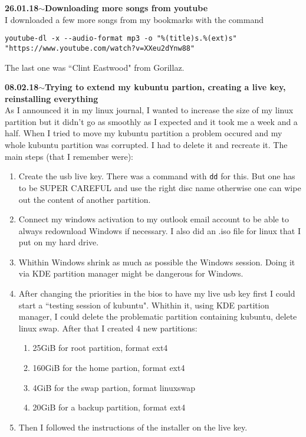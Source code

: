 \documentclass[11pt,a4paper]{article}
\newenvironment{loggentry}[2]%
{\noindent\textbf{#1}\hspace{1cm}$\mathbf{\sim}$\text{ }\textbf{#2}\\}{\vspace{0.5cm}}
\begin{document}
\begin{loggentry}{26.01.18}{Downloading more songs from youtube}
I downloaded a few more songs from my bookmarks with the command
\begin{verbatim}
youtube-dl -x --audio-format mp3 -o "%(title)s.%(ext)s" "https://www.youtube.com/watch?v=XXeu2dYnw88"
\end{verbatim}
The last one was ``Clint Eastwood" from Gorillaz.
\end{loggentry}

\begin{loggentry}{08.02.18}{Trying to extend my kubuntu partion, creating a live key, reinstalling everything}
As I announced it in my linux journal, I wanted to increase the size of my linux partition but it didn't go as smoothly as I expected and it took me a week and a half. When I tried to move my kubuntu partition a problem occured and my whole kubuntu partition was corrupted. I had to delete it and recreate it. The main steps (that I remember were):\\
\begin{enumerate}
\item Create the usb live key. There was a command with \texttt{dd} for this. But one has to be SUPER CAREFUL and use the right disc name otherwise one can wipe out the content of another partition.
\item Connect my windows activation to my outlook email account to be able to always redownload Windows if necessary. I also did an .iso file for linux that I put on my hard drive.
\item Whithin Windows shrink as much as possible the Windows session. Doing it via KDE partition manager might be dangerous for Windows.
\item After changing the priorities in the bios to have my live usb key first I could start a ``testing session of kubuntu". Whithin it, using KDE partition manager, I could delete the problematic partition containing kubuntu, delete linux swap. After that I created 4 new partitions:
\begin{enumerate}
\item 25GiB for root partition, format ext4
\item 160GiB for the home partion, format ext4
\item 4GiB for the swap partion, format linuxswap
\item 20GiB for a backup partition, format ext4
\end{enumerate}
\item Then I followed the instructions of the installer on the live key.

\end{enumerate}
\end{loggentry}
\end{document}

